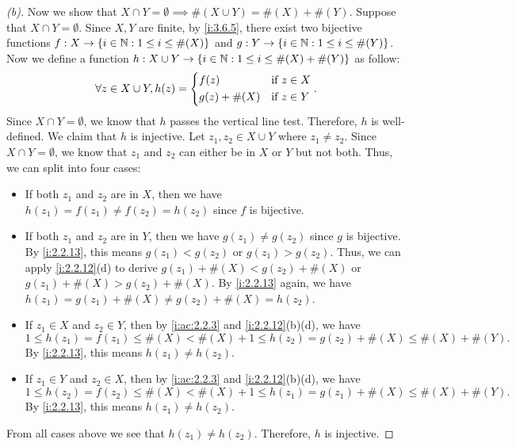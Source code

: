\begin{proof}[(b)]
  Now we show that \(X \cap Y = \emptyset \implies \#(X \cup Y) = \#(X) + \#(Y)\).
  Suppose that \(X \cap Y = \emptyset\).
  Since \(X, Y\) are finite, by \cref{i:3.6.5}, there exist two bijective functions \(f : X \to \left\lbrace i \in \mathbb{N} : 1 \leq i \leq \#(X)\right\rbrace\) and \(g : Y \to \left\lbrace i \in \mathbb{N} : 1 \leq i \leq \#(Y)\right\rbrace\).
  Now we define a function \(h : X \cup Y \to \left\lbrace i \in \mathbb{N} : 1 \leq i \leq \#(X) + \#(Y)\right\rbrace\) as follow:
  \[
    \forall z \in X \cup Y, h(z) = \begin{dcases}
      f(z)         & \text{if } z \in X \\
      g(z) + \#(X) & \text{if } z \in Y
    \end{dcases}.
  \]
  Since \(X \cap Y = \emptyset\), we know that \(h\) passes the vertical line test.
  Therefore, \(h\) is well-defined.
  We claim that \(h\) is injective.
  Let \(z_1, z_2 \in X \cup Y\) where \(z_1 \neq z_2\).
  Since \(X \cap Y = \emptyset\), we know that \(z_1\) and \(z_2\) can either be in \(X\) or \(Y\) but not both.
  Thus, we can split into four cases:
  \begin{itemize}
    \item If both \(z_1\) and \(z_2\) are in \(X\), then we have \(h(z_1) = f(z_1) \neq f(z_2) = h(z_2)\) since \(f\) is bijective.
    \item If both \(z_1\) and \(z_2\) are in \(Y\), then we have \(g(z_1) \neq g(z_2)\) since \(g\) is bijective.
          By \cref{i:2.2.13}, this means \(g(z_1) < g(z_2)\) or \(g(z_1) > g(z_2)\).
          Thus, we can apply \cref{i:2.2.12}(d) to derive \(g(z_1) + \#(X) < g(z_2) + \#(X)\) or \(g(z_1) + \#(X) > g(z_2) + \#(X)\).
          By \cref{i:2.2.13} again, we have \(h(z_1) = g(z_1) + \#(X) \neq g(z_2) + \#(X) = h(z_2)\).
    \item If \(z_1 \in X\) and \(z_2 \in Y\), then by \cref{i:ac:2.2.3} and \cref{i:2.2.12}(b)(d), we have
          \[
            1 \leq h(z_1) = f(z_1) \leq \#(X) < \#(X) + 1 \leq h(z_2) = g(z_2) + \#(X) \leq \#(X) + \#(Y).
          \]
          By \cref{i:2.2.13}, this means \(h(z_1) \neq h(z_2)\).
    \item If \(z_1 \in Y\) and \(z_2 \in X\), then by \cref{i:ac:2.2.3} and \cref{i:2.2.12}(b)(d), we have
          \[
            1 \leq h(z_2) = f(z_2) \leq \#(X) < \#(X) + 1 \leq h(z_1) = g(z_1) + \#(X) \leq \#(X) + \#(Y).
          \]
          By \cref{i:2.2.13}, this means \(h(z_1) \neq h(z_2)\).
  \end{itemize}
  From all cases above we see that \(h(z_1) \neq h(z_2)\).
  Therefore, \(h\) is injective.

\end{proof}
